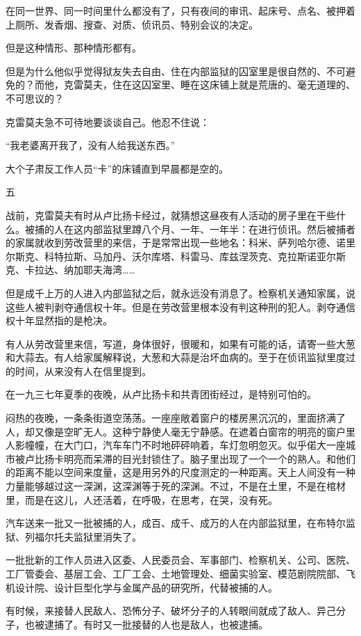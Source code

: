 在同一世界、同一时间里什么都没有了，只有夜间的审讯、起床号、点名、被押着上厕所、发香烟、搜查、对质、侦讯员、特别会议的决定。

但是这种情形、那种情形都有。

但是为什么他似乎觉得狱友失去自由、住在内部监狱的囚室里是很自然的、不可避免的？而他，克雷莫夫，住在这囚室里、睡在这床铺上就是荒唐的、毫无道理的、不可思议的？

克雷莫夫急不可待地要谈谈自己。他忍不住说：

“我老婆离开我了，没有人给我送东西。”

大个子肃反工作人员“卡”的床铺直到早晨都是空的。

五

战前，克雷莫夫有时从卢比扬卡经过，就猜想这昼夜有人活动的房子里在干些什么。被捕的人在这内部监狱里蹲八个月、一年、一年半：在进行侦讯。然后被捕者的家属就收到劳改营里的来信，于是常常出现一些地名：科米、萨列哈尔德、诺里尔斯克、科特拉斯、马加丹、沃尔库塔、科雷马、库兹涅茨克、克拉斯诺亚尔斯克、卡拉达、纳加耶夫海湾……

但是成千上万的人进入内部监狱之后，就永远没有消息了。检察机关通知家属，说这些人被判剥夺通信权十年。但是在劳改营里根本没有判这种刑的犯人。剥夺通信权十年显然指的是枪决。

有人从劳改营里来信，写道，身体很好，很暖和，如果有可能的话，请寄一些大葱和大蒜去。有人给家属解释说，大葱和大蒜是治坏血病的。至于在侦讯监狱里度过的时间，从来没有人在信里提到。

在一九三七年夏季的夜晚，从卢比扬卡和共青团街经过，是特别可怕的。

闷热的夜晚，一条条街道空荡荡。一座座敞着窗户的楼房黑沉沉的，里面挤满了人，却又像是空旷无人。这种宁静使人毫无宁静感。在遮着白窗帘的明亮的窗户里人影幢幢，在大门口，汽车车门不时地砰砰响着，车灯忽明忽灭。似乎偌大一座城市被卢比扬卡明亮而呆滞的目光封锁住了。脑子里出现了一个一个的熟人。和他们的距离不能以空间来度量，这是用另外的尺度测定的一种距离。天上人间没有一种力量能够越过这一深渊，这深渊等于死的深渊。不过，不是在土里，不是在棺材里，而是在这儿，人还活着，在呼吸，在思考，在哭，没有死。

汽车送来一批又一批被捕的人，成百、成千、成万的人在内部监狱里，在布特尔监狱、列福尔托夫监狱里消失了。

一批批新的工作人员进入区委、人民委员会、军事部门、检察机关、公司、医院、工厂管委会、基层工会、工厂工会、土地管理处、细菌实验室、模范剧院院部、飞机设计院、设计巨型化学与金属产品的研究所，代替被捕的人。

有时候，来接替人民敌人、恐怖分子、破坏分子的人转眼间就成了敌人、异己分子，也被逮捕了。有时又一批接替的人也是敌人，也被逮捕。

